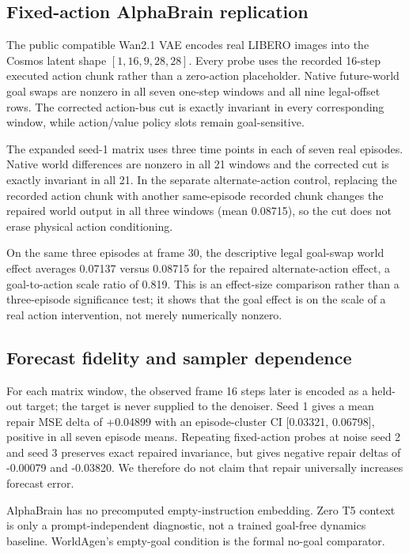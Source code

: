\documentclass[10pt]{article}
\begin{document}
\subsection{Fixed-action AlphaBrain replication}
The public compatible Wan2.1 VAE encodes real LIBERO images into the Cosmos latent shape $[1,16,9,28,28]$. Every probe uses the recorded 16-step executed action chunk rather than a zero-action placeholder. Native future-world goal swaps are nonzero in all seven one-step windows and all nine legal-offset rows. The corrected action-bus cut is exactly invariant in every corresponding window, while action/value policy slots remain goal-sensitive.

The expanded seed-1 matrix uses three time points in each of seven real episodes. Native world differences are nonzero in all 21 windows and the corrected cut is exactly invariant in all 21. In the separate alternate-action control, replacing the recorded action chunk with another same-episode recorded chunk changes the repaired world output in all three windows (mean 0.08715), so the cut does not erase physical action conditioning.

On the same three episodes at frame 30, the descriptive legal goal-swap world effect averages 0.07137 versus 0.08715 for the repaired alternate-action effect, a goal-to-action scale ratio of 0.819. This is an effect-size comparison rather than a three-episode significance test; it shows that the goal effect is on the scale of a real action intervention, not merely numerically nonzero.

\subsection{Forecast fidelity and sampler dependence}
For each matrix window, the observed frame 16 steps later is encoded as a held-out target; the target is never supplied to the denoiser. Seed 1 gives a mean repair MSE delta of +0.04899 with an episode-cluster CI [0.03321, 0.06798], positive in all seven episode means. Repeating fixed-action probes at noise seed 2 and seed 3 preserves exact repaired invariance, but gives negative repair deltas of -0.00079 and -0.03820. We therefore do not claim that repair universally increases forecast error.

AlphaBrain has no precomputed empty-instruction embedding. Zero T5 context is only a prompt-independent diagnostic, not a trained goal-free dynamics baseline. WorldAgen's empty-goal condition is the formal no-goal comparator.
\end{document}
